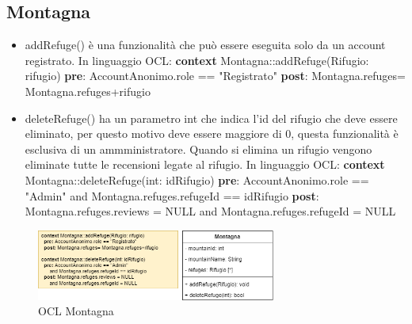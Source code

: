 \documentclass[a4paper,12pt]{article}
\begin{document}
\subsection{Montagna}
\begin{itemize}
    \item addRefuge() è una funzionalità che può essere eseguita solo da un account registrato. \newline\newline In linguaggio OCL:\newline
    \textbf{context} Montagna::addRefuge(Rifugio: rifugio)\newline
    \textbf{pre}: AccountAnonimo.role == "Registrato" \newline
    \textbf{post}: Montagna.refuges= Montagna.refuges+rifugio 
    \item deleteRefuge() ha un parametro int che indica l'id del rifugio che deve essere eliminato, per questo motivo deve essere maggiore di 0, questa funzionalità è esclusiva di un ammministratore. Quando si elimina un rifugio vengono eliminate tutte le recensioni legate al rifugio. \newline\newline In linguaggio OCL:\newline
    \textbf{context} Montagna::deleteRefuge(int: idRifugio)\newline
    \textbf{pre}: AccountAnonimo.role == "Admin" \newline and Montagna.refuges.refugeId == idRifugio \newline
    \textbf{post}: Montagna.refuges.reviews = NULL and Montagna.refuges.refugeId = NULL     
\end{itemize}

\begin{figure}[H]
   \centering
   \includegraphics[width=0.7\textwidth] {D3/img/montagna_OCL.png}
    \caption{OCL Montagna}
\end{figure}
\end{document}
